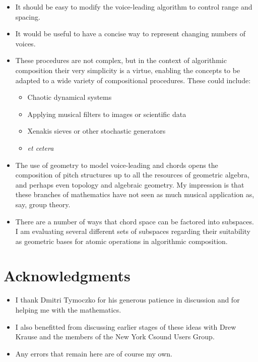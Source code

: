 \documentclass[14pt,letterpaper,onecolumn]{scrartcl}
\begin{document}
\begin{itemize}

\item It should be easy to modify the voice-leading algorithm to control range and spacing.

\item It would be useful to have a concise way to represent changing numbers of voices.

\item These procedures are not complex, but in the context of algorithmic composition their very simplicity is a virtue, enabling the concepts to be adapted to a wide variety of compositional procedures. These could include:

\begin{itemize}

\item Chaotic dynamical systems

\item Applying musical filters to images or scientific data

\item Xenakis sieves or other stochastic generators

\item \emph{et cetera}

\end{itemize}

\item The use of geometry to model voice-leading and chords opens the composition of pitch structures up to all the resources of geometric algebra, and perhaps even topology and algebraic geometry. My impression is that these branches of mathematics have not seen as much musical application as, say, group theory.

\item There are a number of ways that chord space can be factored into subspaces. I am evaluating several different sets of subspaces regarding their suitability as geometric bases for atomic operations in algorithmic composition.

\end{itemize}

\section {Acknowledgments}

\begin{itemize}

\item I thank Dmitri Tymoczko for his generous patience in discussion and for helping me with the mathematics. 

\item I also benefitted from discussing earlier stages of these ideas with Drew Krause and the members of the New York Csound Users Group.

\item Any errors that remain here are of course my own. 

\end{itemize}



\small{

}
\end{document}
